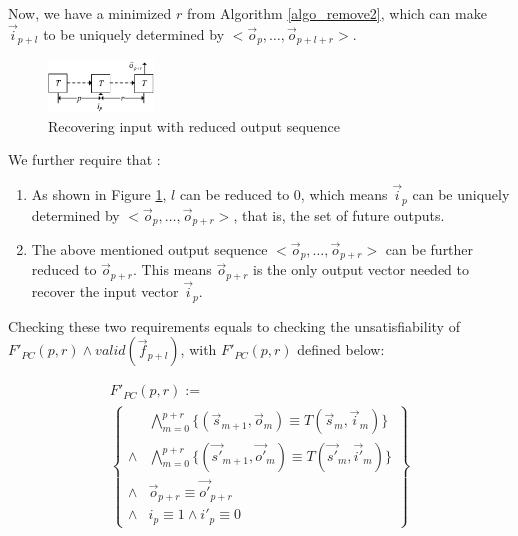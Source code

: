 \documentclass[conference]{IEEEtran}
\begin{document}
Now, 
we have a minimized $r$ from Algorithm \ref{algo_remove2},
which can make $\vec{i}_{p+l}$ to be uniquely determined by $<\vec{o}_{p},\dots,\vec{o}_{p+l+r}>$.

\begin{figure}[b]
\begin{center}
\includegraphics[width=0.25\textwidth]{pc1}
\end{center}
\caption{Recovering input with reduced output sequence}
  \label{fig_pc1}
\end{figure}

We further require that :
\begin{enumerate}
 \item As shown in Figure \ref{fig_pc1},
 $l$ can be reduced to 0,
 which means $\vec{i}_{p}$ can be uniquely determined by $<\vec{o}_{p},\dots,\vec{o}_{p+r}>$,
 that is,
 the set of future outputs.
 \item The above mentioned output sequence $<\vec{o}_{p},\dots,\vec{o}_{p+r}>$ 
 can be further reduced to $\vec{o}_{p+r}$.
 This means $\vec{o}_{p+r}$ is the only output vector needed to recover the input vector $\vec{i}_p$.
\end{enumerate}

Checking these two requirements
equals to checking the unsatisfiability of $F'_{PC}(p,r)\wedge valid(\vec{f}_{p+l})$,
with $F'_{PC}(p,r)$ defined below:

\begin{multline}\label{uniqt11}
F'_{PC}(p,r):=\\
\left\{
\begin{array}{cc}
&\bigwedge_{m=0}^{p+r}
\{
(\vec{s}_{m+1},\vec{o}_m)\equiv T(\vec{s}_m,\vec{i}_m)
\}
\\
\wedge&\bigwedge_{m=0}^{p+r}
\{
(\vec{s'}_{m+1},\vec{o'}_m)\equiv T(\vec{s'}_m,\vec{i'}_m)
\}
\\
\wedge&\vec{o}_{p+r}\equiv \vec{o'}_{p+r} \\
\wedge& i_{p}\equiv 1 \wedge  i'_{p}\equiv 0 
\end{array}
\right\}
\end{multline}
\end{document}
